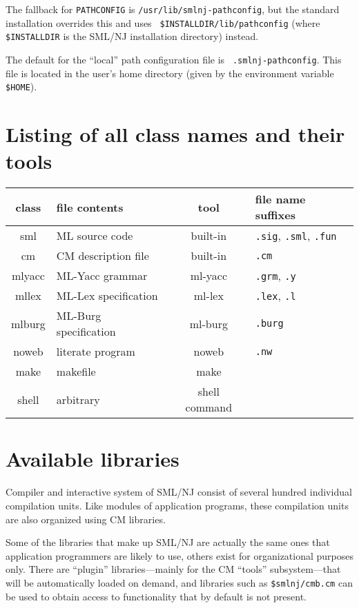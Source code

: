 \documentclass[titlepage,letterpaper]{article}
\begin{document}
The fallback for {\tt PATHCONFIG} is {\tt /usr/lib/smlnj-pathconfig},
but the standard installation overrides this and uses {\tt
\$INSTALLDIR/lib/pathconfig} (where {\tt \$INSTALLDIR} is the SML/NJ
installation directory) instead.

The default for the ``local'' path configuration file is {\tt
.smlnj-pathconfig}. This file is located in the user's home directory
(given by the environment variable {\tt \$HOME}).

\section{Listing of all class names and their tools}

\begin{center}
\begin{tabular}{c|l|c|l}
class & file contents & tool & file name suffixes \\
\hline\hline
sml & ML source code & built-in & {\tt .sig}, {\tt .sml}, {\tt .fun} \\
cm  & CM description file & built-in & {\tt .cm} \\
mlyacc & ML-Yacc grammar & ml-yacc & {\tt .grm}, {\tt .y} \\
mllex & ML-Lex specification & ml-lex & {\tt .lex}, {\tt .l} \\
mlburg & ML-Burg specification & ml-burg & {\tt .burg} \\
noweb & literate program & noweb & {\tt .nw} \\
make & makefile & make & \\
shell & arbitrary & shell command & 
\end{tabular}
\end{center}

\section{Available libraries}

Compiler and interactive system of SML/NJ consist of several hundred
individual compilation units.  Like modules of application programs,
these compilation units are also organized using CM libraries.  

Some of the libraries that make up SML/NJ are actually the same ones
that application programmers are likely to use, others exist for
organizational purposes only.  There are ``plugin'' libraries---mainly
for the CM ``tools'' subsystem---that will be automatically loaded on
demand, and libraries such as {\tt \$smlnj/cmb.cm} can be used to
obtain access to functionality that by default is not present.
\end{document}
